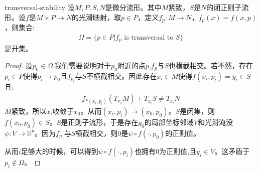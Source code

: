 \documentclass{package/fancy-book}
\newcommand{\R}{\mathbb{R}}
\begin{document}
\begin{theorem}[横截相交的稳定性]{transversal-stability}
    设$M,P,S,N$是微分流形。其中$M$紧致，$S$是$N$的闭正则子流形。设$f$是$M \times P \to N$的光滑映射，取$p \in P$，定义$f_p:M \to N$，$f_p(x)=f(x,p)$，则集合:
    \begin{align}
        \Omega=\{p \in P|f_p\text{ is transversal to  }S\}
    \end{align}是开集。
\end{theorem}
\begin{proof}
    设$p_0 \in \Omega$.我们需要说明对于$p_0$附近的点$p$,$f_p$与$S$也横截相交。若不然，存在$p_i \in P$使得$p_i \to p_0$且$f_{p_i}$与$S$不横截相交。因此存在$x_i \in M$使得$f(x_i,p_i)=y_i \in S$且:
    \begin{align}
        f_{*(x_i,p_i)}(T_{x_i}M)+T_{y_i}S \neq T_{y_i}N
    \end{align}
    $M$紧致，所以$x_i$收敛于$x_0$。从而$(x_i,p_i)\to (x_0,p_0)$。$S$是闭集，则$f(x_0,p_0)\in S$。$S$是正则子流形，于是存在$y_0$的局部坐标邻域$V$和光滑淹没$\psi:V \to \R^k$。因为$f_{p_0}$与$S$横截相交，则$0$是$\psi \circ f(\cdot,p_0)$的正则值。

    从而$i$足够大的时候，可以得到$\psi \circ f(\cdot,p_i)$也拥有$0$为正则值,且$y_i \in V$。这矛盾于$p_i \notin \Omega$。
    
\end{proof}
\end{document}
